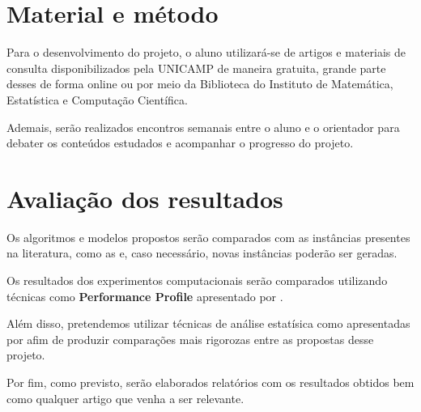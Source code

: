 \documentclass[11pt]{article}
\begin{document}
\section{Material e método}
\label{sec:org01d4144}
Para o desenvolvimento do projeto, o aluno utilizará-se de artigos e materiais de consulta disponibilizados pela UNICAMP de maneira gratuita, grande parte desses de forma online ou por meio da Biblioteca do Instituto de Matemática, Estatística e Computação Científica.

Ademais, serão realizados encontros semanais entre o aluno e o orientador para debater os conteúdos estudados e acompanhar o progresso do projeto.

\section{Avaliação dos resultados}
\label{sec:org1e7177c}
Os algoritmos e modelos propostos serão comparados com as instâncias presentes na literatura, como as \textcite{GraphColoringInstances} e, caso necessário, novas instâncias poderão ser geradas.

Os resultados dos experimentos computacionais serão comparados utilizando técnicas como \textbf{Performance Profile} apresentado por \textcite{Dolan2002Benchmarkingoptimizationsoftware}.

Além disso, pretendemos utilizar técnicas de análise estatísica como apresentadas por \autocite{Derrac2011practicaltutorialuse} afim de produzir comparações mais rigorozas entre as propostas desse projeto.

Por fim, como previsto, serão elaborados relatórios com os resultados obtidos bem como qualquer artigo que venha a ser relevante.

\printbibliography
\end{document}
